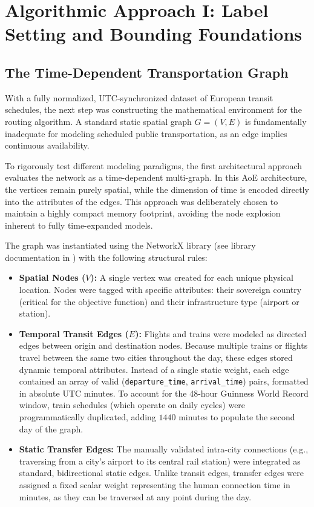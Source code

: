\chapter{Algorithmic Approach I: Label Setting and Bounding Foundations}
\label{chap:label_setting_approach}

\section{The Time-Dependent Transportation Graph}
\label{sec:time_dependent_graph}

With a fully normalized, UTC-synchronized dataset of European transit schedules, the next step was constructing the mathematical environment for the routing algorithm. A standard static spatial graph $G = (V, E)$ is fundamentally inadequate for modeling scheduled public transportation, as an edge implies continuous availability.

\medskip

To rigorously test different modeling paradigms, the first architectural approach evaluates the network as a time-dependent multi-graph. In this AoE architecture, the vertices remain purely spatial, while the dimension of time is encoded directly into the attributes of the edges. This approach was deliberately chosen to maintain a highly compact memory footprint, avoiding the node explosion inherent to fully time-expanded models.

\medskip

The graph was instantiated using the NetworkX library (see library documentation in \cite{hagberg2008exploring}) with the following structural rules:

\begin{itemize}
    \item \textbf{Spatial Nodes ($V$):} A single vertex was created for each unique physical location. Nodes were tagged with specific attributes: their sovereign country (critical for the objective function) and their infrastructure type (airport or station). 
    \item \textbf{Temporal Transit Edges ($E$):} Flights and trains were modeled as directed edges between origin and destination nodes. Because multiple trains or flights travel between the same two cities throughout the day, these edges stored dynamic temporal attributes. Instead of a single static weight, each edge contained an array of valid (\texttt{departure\_time}, \texttt{arrival\_time}) pairs, formatted in absolute UTC minutes. To account for the 48-hour Guinness World Record window, train schedules (which operate on daily cycles) were programmatically duplicated, adding $1440$ minutes to populate the second day of the graph.
    \item \textbf{Static Transfer Edges:} The manually validated intra-city connections (e.g., traversing from a city's airport to its central rail station) were integrated as standard, bidirectional static edges. Unlike transit edges, transfer edges were assigned a fixed scalar weight representing the human connection time in minutes, as they can be traversed at any point during the day.
\end{itemize}

